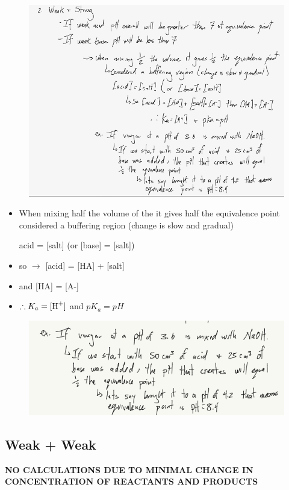 \documentclass{article}
\begin{document}
\begin{enumerate}
\begin{figure}[H]
\includegraphics[width=\textwidth]{4.6figs.png}
\end{figure}

\begin{itemize}
\item When mixing half the volume of the it gives half the equivalence point\\considered a buffering region (change is slow and gradual)
\item [acid] = [salt] (or [base] = [salt])
\item so $\rightarrow$ [acid] = [HA] + [salt]
\item and [HA] = [A-]
\item $\therefore K_{a} = \ce{[H+]}$ and $pK_{a} = pH$
\end{itemize}

\begin{figure}[H]
\includegraphics[width=\textwidth]{4.6fig4.png}
\end{figure}

\subsection{Weak + Weak}
\textbf{NO CALCULATIONS DUE TO MINIMAL CHANGE IN CONCENTRATION OF REACTANTS AND PRODUCTS}

\end{enumerate}
\end{document}

